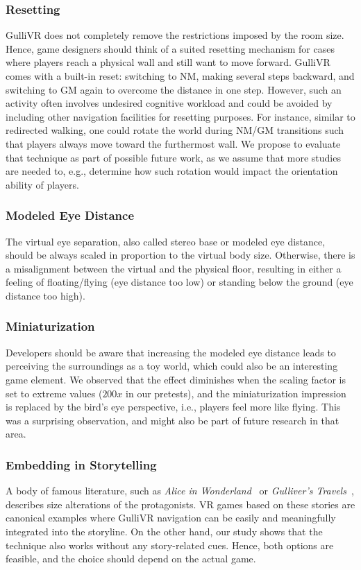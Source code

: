\documentclass{sigchi}
\begin{document}
\subsubsection{Resetting}
GulliVR does not completely remove the restrictions imposed by the room size. Hence, game designers should think of a suited resetting mechanism for cases where players reach a physical wall and still want to move forward. GulliVR comes with a built-in reset: switching to NM, making several steps backward, and switching to GM again to overcome the distance in one step. However, such an activity often involves undesired cognitive workload and could be avoided by including other navigation facilities for resetting purposes. For instance, similar to redirected walking, one could rotate the world during NM/GM transitions such that players always move toward the furthermost wall. We propose to evaluate that technique as part of possible future work, as we assume that more studies are needed to, e.g., determine how such rotation would impact the orientation ability of players.

\subsubsection{Modeled Eye Distance}
The virtual eye separation, also called stereo base or modeled eye distance, should be always scaled in proportion to the virtual body size. Otherwise, there is a misalignment between the virtual and the physical floor, resulting in either a feeling of floating/flying (eye distance too low) or standing below the ground (eye distance too high).

\subsubsection{Miniaturization} 
Developers should be aware that increasing the modeled eye distance leads to perceiving the surroundings as a toy world, which could also be an interesting game element. We observed that the effect diminishes when the scaling factor is set to extreme values ($200x$ in our pretests), and the miniaturization impression is replaced by the bird's eye perspective, i.e., players feel more like flying. This was a surprising observation, and might also be part of future research in that area. 


\subsubsection{Embedding in Storytelling} 
A body of famous literature, such as \textit{Alice in Wonderland}~\cite{carroll2011alice} or \textit{Gulliver's Travels}~\cite{swift1995gulliver}, describes size alterations of the protagonists. VR games based on these stories are canonical examples where GulliVR navigation can be easily and meaningfully integrated into the storyline. On the other hand, our study shows that the technique also works without any story-related cues. Hence, both options are feasible, and the choice should depend on the actual game.
\end{document}
